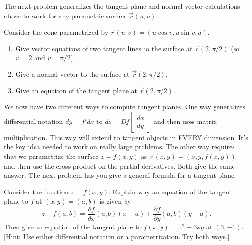 The next problem generalizes the tangent plane and normal vector calculations above to work for any parametric surface $\vec r(u,v)$.
\begin{problem}%
%
 Consider the cone parametrized by $\vec r(u,v)=(u\cos v, u\sin v,u)$.
 \begin{enumerate}
 \item Give vector equations of two tangent lines to the surface at $\vec r(2,\pi/2)$ (so $u=2$ and $v=\pi/2$).
 \item Give a normal vector to the surface at $\vec r(2,\pi/2)$.
 \item Give an equation of the tangent plane at $\vec r(2,\pi/2)$.
 \end{enumerate}
\end{problem}


We now have two different ways to compute tangent planes.  One way generalizes differential notation $dy=f'dx$ to 
$dz = Df \begin{bmatrix}dx\\dy\end{bmatrix}$ and then uses matrix multiplication. This way will extend to tangent objects in EVERY dimension.  It's the key idea needed to work on really large problems.  The other way requires that we parametrize the surface $z=f(x,y)$ as $\vec r(x,y)=(x,y,f(x,y))$ and then use the cross product on the partial derivatives. Both give the same answer. The next problem has you give a general formula for a tangent plane.


\begin{problem}
 Consider the function $z=f(x,y)$. Explain why an equation of the tangent plane to $f$ at $(x,y)=(a,b)$ is given by  
$$z-f(a,b) = \frac{\partial f}{\partial x}(a,b) (x-a) +  \frac{\partial f}{\partial y}(a,b) (y-a).$$
Then give an equation of the tangent plane to $f(x,y) = x^2+3xy$ at $(3,-1)$. 
[Hint: Use either differential notation or a parametrization. Try both ways.]
\end{problem}




